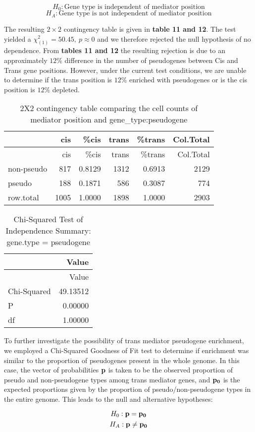 \documentclass[
  12pt,
]{article}
\begin{document}
\[ H_0: \text{Gene type is independent of mediator position}  \]
\[ H_A: \text{Gene type is not independent of mediator position}  \]

The resulting \(2\times 2\) contingency table is given in
\textbf{table 11 and 12}. The test yielded a
\(\chi_{(1)}^2 = 50.45, \ p \approx 0\) and we therefore rejected the
null hypothesis of no dependence. From \textbf{tables 11 and 12} the
resulting rejection is due to an approximately \(12\%\) difference in
the number of pseudogenes between Cis and Trans gene positions. However,
under the current test conditions, we are unable to determine if the
trans position is \(12\%\) enriched with pseudogenes or is the cis
position is \(12\%\) depleted.

\begin{longtable}[]{@{}lrrrrr@{}}
\caption{2X2 contingency table comparing the cell counts of mediator
position and gene\_type:pseudogene}\tabularnewline
\toprule
& cis & \%cis & trans & \%trans & Col.Total\tabularnewline
\midrule
\endfirsthead
\toprule
& cis & \%cis & trans & \%trans & Col.Total\tabularnewline
\midrule
\endhead
non-pseudo & 817 & 0.8129 & 1312 & 0.6913 & 2129\tabularnewline
pseudo & 188 & 0.1871 & 586 & 0.3087 & 774\tabularnewline
row.total & 1005 & 1.0000 & 1898 & 1.0000 & 2903\tabularnewline
\bottomrule
\end{longtable}

\begin{longtable}[]{@{}lr@{}}
\caption{Chi-Squared Test of Independence Summary: gene.type =
pseudogene}\tabularnewline
\toprule
& Value\tabularnewline
\midrule
\endfirsthead
\toprule
& Value\tabularnewline
\midrule
\endhead
Chi-Squared & 49.13512\tabularnewline
P & 0.00000\tabularnewline
df & 1.00000\tabularnewline
\bottomrule
\end{longtable}

To further investigate the possibility of trans mediator pseudogene
enrichment, we employed a Chi-Squared Goodness of Fit test to determine
if enrichment was similar to the proportion of pseudogenes present in
the whole genome. In this case, the vector of probabilities \({\bf p}\)
is taken to be the observed proportion of pseudo and non-pseudogene
types among trans mediator genes, and \({\bf p_0}\) is the expected
proportions given by the proportion of pseudo/non-pseudogene types in
the entire genome. This leads to the null and alternative hypotheses:

\[ H_0: {\bf p} = {\bf p_0}  \] \[ H_A: {\bf p} \neq {\bf p_0} \]
\end{document}
